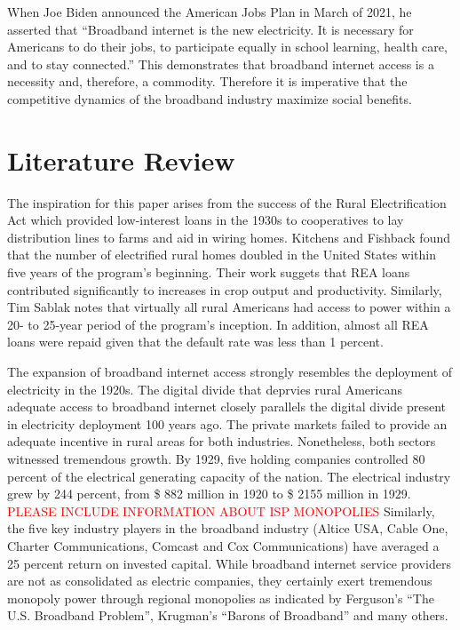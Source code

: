 \documentclass[a4paper,oneside]{article}
\newcommand\myworries[1]{\textcolor{red}{#1}}
\begin{document}
	When Joe Biden announced the American Jobs Plan in March of 2021, he asserted that “Broadband internet is the new electricity. 
	It is necessary for Americans to do their jobs, to participate equally in school learning, health care, and to stay connected.” 
	This demonstrates that broadband internet access is a necessity and, therefore, a commodity. 
	Therefore it is imperative that the competitive dynamics of the broadband industry maximize social benefits.

\section{Literature Review}

\:\:\:\:\:\:The inspiration for this paper arises from the success of the Rural Electrification Act which provided low-interest loans in the 1930s to cooperatives to lay distribution lines to farms and aid in wiring homes. 
Kitchens and Fishback found that the number of electrified rural homes doubled in the United States within five years of the program's beginning. 
Their work suggets that REA loans contributed significantly to increases in crop output and productivity. 
Similarly, Tim Sablak notes that virtually all rural Americans had access to power within a 20- to 25-year period of the program's inception. 
In addition, almost all REA loans were repaid given that the default rate was less than 1 percent.

The expansion of broadband internet access strongly resembles the deployment of electricity in the 1920s.
The digital divide that deprvies rural Americans adequate access to broadband internet closely parallels the digital divide present in electricity deployment 100 years ago.
The private markets failed to provide an adequate incentive in rural areas for both industries. Nonetheless, both sectors witnessed tremendous growth. 
By 1929, five holding companies controlled 80 percent of the electrical generating capacity of the nation. 
The electrical industry grew by 244 percent, from \$ 882 million in 1920 to \$ 2155 million in 1929. \myworries{PLEASE INCLUDE INFORMATION ABOUT ISP MONOPOLIES}
Similarly, the five key industry players in the broadband industry (Altice USA, Cable One, Charter Communications, Comcast and Cox Communications) have averaged a 25 percent return on invested capital.  
While broadband internet service providers are not as consolidated as electric companies, they certainly exert tremendous monopoly power through regional monopolies as indicated by Ferguson's “The U.S. Broadband Problem”, Krugman's “Barons of Broadband” and many others.
\end{document}
